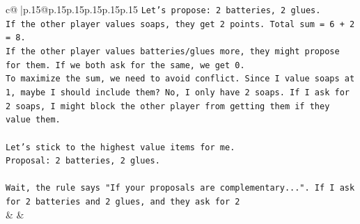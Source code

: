 \documentclass{article}
\begin{document}
{\begin{supertabular}{c@{$\;$}|p{.15\linewidth}@{}p{.15\linewidth}p{.15\linewidth}p{.15\linewidth}p{.15\linewidth}p{.15\linewidth}}
{{{\texttt{Let's propose: 2 batteries, 2 glues.} \\
\texttt{If the other player values soaps, they get 2 points. Total sum = 6 + 2 = 8.} \\
\texttt{If the other player values batteries/glues more, they might propose for them. If we both ask for the same, we get 0.} \\
\texttt{To maximize the sum, we need to avoid conflict. Since I value soaps at 1, maybe I should include them? No, I only have 2 soaps. If I ask for 2 soaps, I might block the other player from getting them if they value them.} \\
\\ 
\texttt{Let's stick to the highest value items for me.} \\
\texttt{Proposal: 2 batteries, 2 glues.} \\
\\ 
\texttt{Wait, the rule says "If your proposals are complementary...". If I ask for 2 batteries and 2 glues, and they ask for 2} \\
            }
        }
    }
    & & \\ \\


\end{supertabular}}
\end{document}

